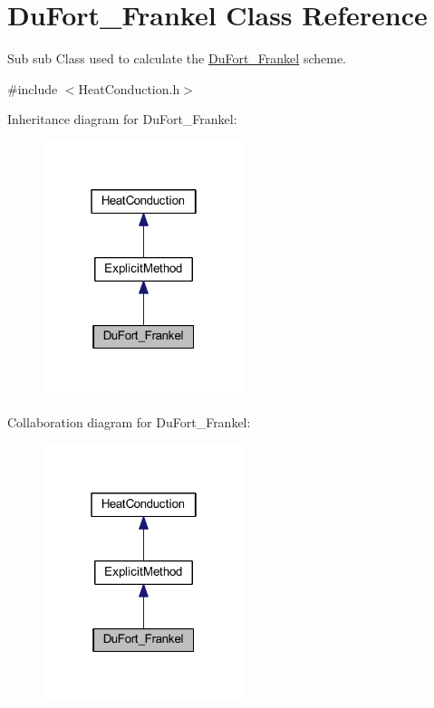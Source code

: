 \hypertarget{class_du_fort___frankel}{}\section{Du\+Fort\+\_\+\+Frankel Class Reference}
\label{class_du_fort___frankel}


Sub sub Class used to calculate the \hyperlink{class_du_fort___frankel}{Du\+Fort\+\_\+\+Frankel} scheme.  




{\ttfamily \#include $<$Heat\+Conduction.\+h$>$}



Inheritance diagram for Du\+Fort\+\_\+\+Frankel\+:\nopagebreak
\begin{figure}[H]
\begin{center}
\leavevmode
\includegraphics[width=166pt]{class_du_fort___frankel__inherit__graph}
\end{center}
\end{figure}


Collaboration diagram for Du\+Fort\+\_\+\+Frankel\+:\nopagebreak
\begin{figure}[H]
\begin{center}
\leavevmode
\includegraphics[width=166pt]{class_du_fort___frankel__coll__graph}
\end{center}
\end{figure}

